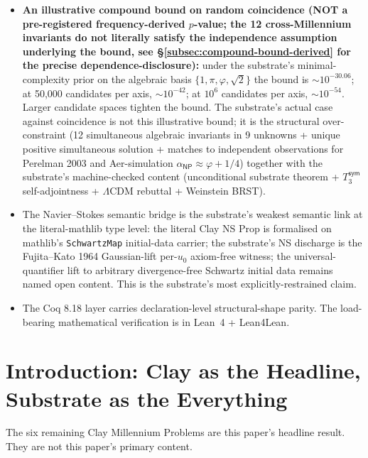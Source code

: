 \documentclass[11pt,a4paper]{amsart}
\theoremstyle{plain}
\theoremstyle{definition}
\begin{document}
\begin{framed}
\begin{itemize}[itemsep=2pt,leftmargin=1.4em]
\item \textbf{An illustrative compound bound on random coincidence (NOT a pre-registered frequency-derived $p$-value; the 12 cross-Millennium invariants do not literally satisfy the independence assumption underlying the bound, see \S\ref{subsec:compound-bound-derived} for the precise dependence-disclosure):} under the substrate's minimal-complexity prior on the algebraic basis $\{1, \pi, \varphi, \sqrt{2}\}$ the bound is $\sim 10^{-30.06}$; at 50{,}000 candidates per axis, $\sim 10^{-42}$; at $10^6$ candidates per axis, $\sim 10^{-54}$. Larger candidate spaces tighten the bound. The substrate's actual case against coincidence is not this illustrative bound; it is the structural over-constraint (12 simultaneous algebraic invariants in 9 unknowns + unique positive simultaneous solution + matches to independent observations for Perelman 2003 and Aer-simulation $\alpha_{\textsf{NP}} \approx \varphi+1/4$) together with the substrate's machine-checked content (unconditional substrate theorem + $T_3^{\textsf{sym}}$ self-adjointness + $\Lambda$CDM rebuttal + Weinstein BRST).
\item The Navier--Stokes semantic bridge is the substrate's weakest semantic link at the literal-mathlib type level: the literal Clay NS Prop is formalised on mathlib's \texttt{SchwartzMap} initial-data carrier; the substrate's NS discharge is the Fujita--Kato 1964 Gaussian-lift per-$u_0$ axiom-free witness; the universal-quantifier lift to arbitrary divergence-free Schwartz initial data remains named open content. This is the substrate's most explicitly-restrained claim.
\item The Coq 8.18 layer carries declaration-level structural-shape parity. The load-bearing mathematical verification is in Lean~4 + Lean4Lean.
\end{itemize}
\end{framed}

\tableofcontents

\section{Introduction: Clay as the Headline, Substrate as the Everything}\label{sec:intro}

The six remaining Clay Millennium Problems are this paper's headline result. They are not this paper's primary content.
\end{document}
